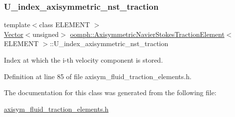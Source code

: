 \subsubsection{\texorpdfstring{U\+\_\+index\+\_\+axisymmetric\+\_\+nst\+\_\+traction}{U\_index\_axisymmetric\_nst\_traction}}
{\footnotesize\ttfamily template$<$class E\+L\+E\+M\+E\+NT $>$ \\
\hyperlink{classoomph_1_1Vector}{Vector}$<$unsigned$>$ \hyperlink{classoomph_1_1AxisymmetricNavierStokesTractionElement}{oomph\+::\+Axisymmetric\+Navier\+Stokes\+Traction\+Element}$<$ E\+L\+E\+M\+E\+NT $>$\+::U\+\_\+index\+\_\+axisymmetric\+\_\+nst\+\_\+traction\hspace{0.3cm}{\ttfamily [protected]}}



Index at which the i-\/th velocity component is stored. 



Definition at line 85 of file axisym\+\_\+fluid\+\_\+traction\+\_\+elements.\+h.



The documentation for this class was generated from the following file\+:\begin{DoxyCompactItemize}
\item 
\hyperlink{axisym__fluid__traction__elements_8h}{axisym\+\_\+fluid\+\_\+traction\+\_\+elements.\+h}\end{DoxyCompactItemize}
